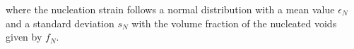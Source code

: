 where the nucleation strain follows a normal distribution with a mean
value $\epsilon_N$ and a standard deviation $s_N$ with the volume
fraction of the nucleated voids given by $f_N$.


